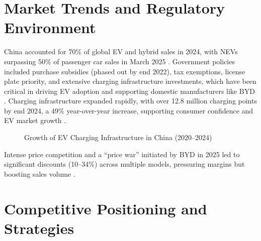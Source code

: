 \documentclass{article}
\begin{document}
\section{Market Trends and Regulatory Environment}

China accounted for 70\% of global EV and hybrid sales in 2024, with NEVs surpassing 50\% of passenger car sales in March 2025 \citep{techinasia2025}. Government policies included purchase subsidies (phased out by end 2022), tax exemptions, license plate priority, and extensive charging infrastructure investments, which have been critical in driving EV adoption and supporting domestic manufacturers like BYD \citep{techreview2023,sciencedirect2024}. Charging infrastructure expanded rapidly, with over 12.8 million charging points by end 2024, a 49\% year-over-year increase, supporting consumer confidence and EV market growth \citep{argus2024}.

\begin{figure}[ht]
\centering
{}
\caption{Growth of EV Charging Infrastructure in China (2020--2024) \citep{argus2024}}
\label{fig:charging}
\end{figure}

Intense price competition and a ``price war'' initiated by BYD in 2025 led to significant discounts (10--34\%) across multiple models, pressuring margins but boosting sales volume \citep{onglobal2025}.

\section{Competitive Positioning and Strategies}
\end{document}
